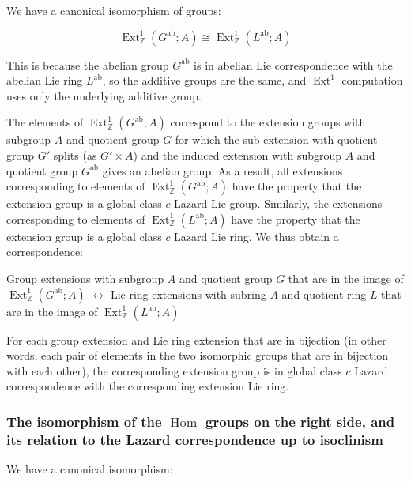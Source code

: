 We have a canonical isomorphism of groups:

$$\operatorname{Ext}^1_{\mathbb{Z}}(G^{\operatorname{ab}};A) \cong \operatorname{Ext}^1_{\mathbb{Z}}(L^{\operatorname{ab}};A)$$

This is because the abelian group $G^{\operatorname{ab}}$ is in
abelian Lie correspondence with the abelian Lie ring
$L^{\operatorname{ab}}$, so the additive groups are the same, and
$\operatorname{Ext}^1$ computation uses only the underlying additive
group.

The elements of
$\operatorname{Ext}^1_{\mathbb{Z}}(G^{\operatorname{ab}};A)$
correspond to the extension groups with subgroup $A$ and quotient
group $G$ for which the sub-extension with quotient group $G'$ splits
(as $G' \times A$) and the induced extension with subgroup $A$ and
quotient group $G^{\operatorname{ab}}$ gives an abelian group. As a
result, all extensions corresponding to elements of
$\operatorname{Ext}^1_{\mathbb{Z}}(G^{\operatorname{ab}};A)$ have the
property that the extension group is a global class $c$ Lazard Lie
group. Similarly, the extensions corresponding to elements of
$\operatorname{Ext}^1_{\mathbb{Z}}(L^{\operatorname{ab}};A)$ have the
property that the extension group is a global class $c$ Lazard Lie
ring. We thus obtain a correspondence:

\begin{center}
Group extensions with subgroup $A$ and quotient group $G$ that are in
the image of
$\operatorname{Ext}^1_{\mathbb{Z}}(G^{\operatorname{ab}};A)$
$\leftrightarrow$ Lie ring extensions with subring $A$ and quotient
ring $L$ that are in the image of $\operatorname{Ext}^1_{\mathbb{Z}}(L^{\operatorname{ab}};A)$ 
\end{center}

For each group extension and Lie ring extension that are in bijection
(in other words, each pair of elements in the two isomorphic groups
that are in bijection with each other), the corresponding extension
group is in global class $c$ Lazard correspondence with the
corresponding extension Lie ring.

\subsubsection{The isomorphism of the $\operatorname{Hom}$ groups on the right side, and its relation to the Lazard correspondence up to isoclinism}\label{sec:glcuti-extensions-main}

We have a canonical isomorphism:

